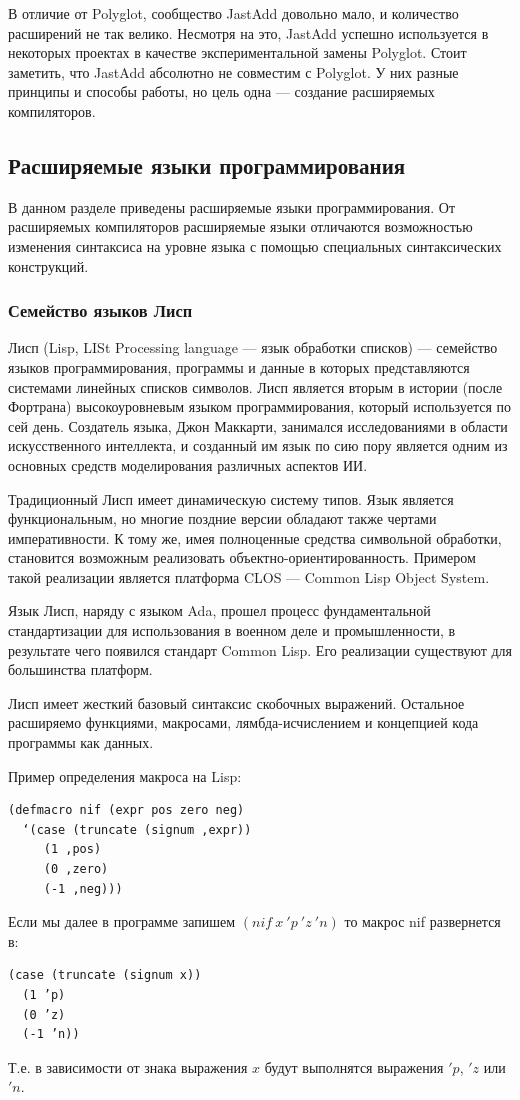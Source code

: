 \documentclass[a4paper,12pt,titlepage]{extarticle}
\begin{document}
В отличие от Polyglot, сообщество JastAdd довольно мало, и количество
расширений не так велико. Несмотря на это, JastAdd успешно используется в
некоторых проектах в качестве экспериментальной замены Polyglot. Стоит
заметить, что JastAdd абсолютно не совместим с Polyglot. У них разные принципы
и способы работы, но цель одна --- создание расширяемых компиляторов.

\subsection{Расширяемые языки программирования}
В данном разделе приведены расширяемые языки программирования. От расширяемых
компиляторов расширяемые языки отличаются возможностью изменения синтаксиса на
уровне языка с помощью специальных синтаксических конструкций.

\subsubsection*{Семейство языков Лисп}
\label{lisp}
Лисп (Lisp, LISt Processing language --- язык обработки списков) --- семейство
языков программирования, программы и данные в которых представляются системами
линейных списков символов. Лисп является вторым в истории (после Фортрана)
высокоуровневым языком программирования, который используется по сей день.
Создатель языка, Джон Маккарти, занимался исследованиями в области
искусственного интеллекта, и созданный им язык по сию пору является одним из
основных средств моделирования различных аспектов ИИ.   

Традиционный Лисп имеет динамическую систему типов. Язык является
функциональным, но многие поздние версии обладают также чертами императивности.
К тому же, имея полноценные средства символьной обработки, становится возможным
реализовать объектно-ориентированность. Примером такой реализации является
платформа CLOS --- Common Lisp Object System.

Язык Лисп, наряду с языком Ada, прошел процесс фундаментальной стандартизации
для использования в военном деле и промышленности, в результате чего появился
стандарт Common Lisp. Его реализации существуют для большинства платформ.

Лисп имеет жесткий базовый синтаксис скобочных выражений. Остальное расширяемо
функциями, макросами, лямбда-исчислением и концепцией кода программы как
данных.

Пример определения макроса на Lisp:
\begin{verbatim}
(defmacro nif (expr pos zero neg)
  ‘(case (truncate (signum ,expr))
     (1 ,pos)
     (0 ,zero)
     (-1 ,neg)))
\end{verbatim}
Если мы далее в программе запишем $(nif ~ x ~ 'p ~ 'z ~ 'n)$ то макрос nif
развернется в:
\begin{verbatim}
(case (truncate (signum x))
  (1 ’p)
  (0 ’z)
  (-1 ’n))
\end{verbatim}
Т.е. в зависимости от знака выражения $x$ будут выполнятся выражения $'p$, $'z$
или $'n$.
\end{document}

